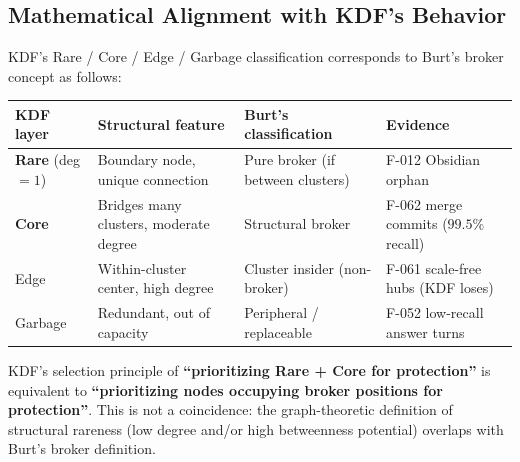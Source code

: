\subsection{Mathematical Alignment with KDF's Behavior}\label{mathematical-alignment-with-kdfs-behavior}

KDF's Rare / Core / Edge / Garbage classification corresponds to Burt's broker concept as follows:

{\def\LTcaptype{none} %
\begin{longtable}[]{@{}
  >{\raggedright\arraybackslash}p{}
  >{\raggedright\arraybackslash}p{}
  >{\raggedright\arraybackslash}p{}
  >{\raggedright\arraybackslash}p{}@{}}
\toprule\noalign{}
\begin{minipage}[b]{\linewidth}\raggedright
KDF layer
\end{minipage} & \begin{minipage}[b]{\linewidth}\raggedright
Structural feature
\end{minipage} & \begin{minipage}[b]{\linewidth}\raggedright
Burt's classification
\end{minipage} & \begin{minipage}[b]{\linewidth}\raggedright
Evidence
\end{minipage} \\
\midrule\noalign{}
\endhead
\bottomrule\noalign{}
\endlastfoot
\textbf{Rare} (deg \(= 1\)) & Boundary node, unique connection & Pure broker (if between clusters) & F-012 Obsidian orphan \\
\textbf{Core} & Bridges many clusters, moderate degree & Structural broker & F-062 merge commits (\(99.5\%\) recall) \\
Edge & Within-cluster center, high degree & Cluster insider (non-broker) & F-061 scale-free hubs (KDF loses) \\
Garbage & Redundant, out of capacity & Peripheral / replaceable & F-052 low-recall answer turns \\
\end{longtable}
}

KDF's selection principle of \textbf{``prioritizing Rare + Core for protection''} is equivalent to \textbf{``prioritizing nodes occupying broker positions for protection''}. This is not a coincidence: the graph-theoretic definition of structural rareness (low degree and/or high betweenness potential) overlaps with Burt's broker definition.

